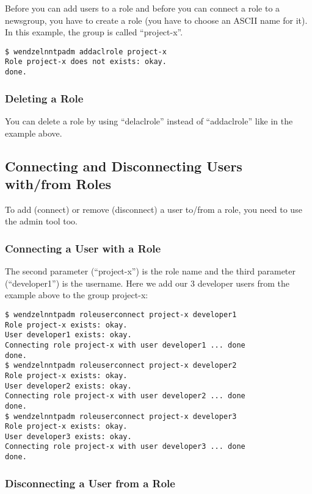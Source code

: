 Before you can add users to a role and before you can connect a role to a newsgroup, you have to create a role (you have to choose an ASCII name for it). In this example, the group is called ``project-x''.

\begin{verbatim}
$ wendzelnntpadm addaclrole project-x
Role project-x does not exists: okay.
done.
\end{verbatim}

\subsubsection{Deleting a Role}

You can delete a role by using ``delaclrole'' instead of ``addaclrole'' like in the example above.

\subsection{Connecting and Disconnecting Users with/from Roles}

To add (connect) or remove (disconnect) a user to/from a role, you need to use the admin tool too.

\subsubsection{Connecting a User with a Role}

The second parameter (``project-x'') is the role name and the third parameter (``developer1'') is the username. Here we add our 3 developer users from the example above to the group project-x:

\begin{verbatim}
$ wendzelnntpadm roleuserconnect project-x developer1
Role project-x exists: okay.
User developer1 exists: okay.
Connecting role project-x with user developer1 ... done
done.
$ wendzelnntpadm roleuserconnect project-x developer2
Role project-x exists: okay.
User developer2 exists: okay.
Connecting role project-x with user developer2 ... done
done.
$ wendzelnntpadm roleuserconnect project-x developer3
Role project-x exists: okay.
User developer3 exists: okay.
Connecting role project-x with user developer3 ... done
done.
\end{verbatim}

\subsubsection{Disconnecting a User from a Role}

